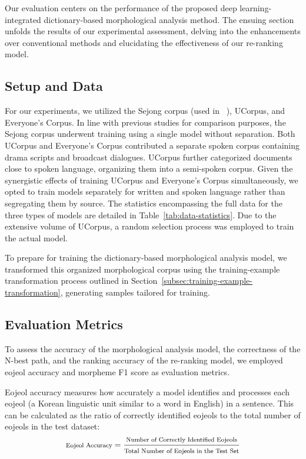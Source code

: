 \documentclass[AMS,STIX2COL]{WileyNJD-v2}
\begin{document}
    Our evaluation centers on the performance of the proposed deep learning-integrated dictionary-based morphological analysis method.
    The ensuing section unfolds the results of our experimental assessment, delving into the enhancements over conventional methods and elucidating the effectiveness of our re-ranking model.

    \subsection{Setup and Data}\label{subsec:setup-and-data}

    For our experiments, we utilized the Sejong corpus (used in ~\cite{MinJW2019, MinJW2020, MinJW2022, MinJW2018, NaSH2015, NaSH2014, NaSH2018, SongHJ2019, SongHJ2020}), UCorpus\cite{UCorpusHG}, and Everyone's Corpus\cite{EveryoneCorpus}.
    In line with previous studies for comparison purposes, the Sejong corpus underwent training using a single model without separation.
    Both UCorpus and Everyone's Corpus contributed a separate spoken corpus containing drama scripts and broadcast dialogues.
    UCorpus further categorized documents close to spoken language, organizing them into a semi-spoken corpus.
    Given the synergistic effects of training UCorpus and Everyone's Corpus simultaneously, we opted to train models separately for written and spoken language rather than segregating them by source.
    The statistics encompassing the full data for the three types of models are detailed in Table~\ref{tab:data-statistics}.
    Due to the extensive volume of UCorpus, a random selection process was employed to train the actual model.

    To prepare for training the dictionary-based morphological analysis model, we transformed this organized morphological corpus using the training-example transformation process outlined in Section~\ref{subsec:training-example-transformation}, generating samples tailored for training.

    \subsection{Evaluation Metrics}\label{subsec:evaluation-metrics}

    To assess the accuracy of the morphological analysis model, the correctness of the N-best path, and the ranking accuracy of the re-ranking model, we employed eojeol accuracy and morpheme F1 score as evaluation metrics.

    Eojeol accuracy measures how accurately a model identifies and processes each eojeol (a Korean linguistic unit similar to a word in English) in a sentence.
    This can be calculated as the ratio of correctly identified eojeols to the total number of eojeols in the test dataset:
    \vspace{1mm}
    \[
        \footnotesize
        \text{Eojeol Accuracy} = \frac{\text{Number of Correctly Identified Eojeols}}{\text{Total Number of Eojeols in the Test Set}}
    \]
    \vspace{0.5mm}
\end{document}
